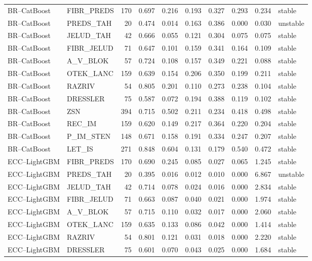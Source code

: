 \begin{longtable}{llrrrrrrrl}
BR--CatBoost & FIBR\_PREDS & 170 & 0.697 & 0.216 & 0.193 & 0.327 & 0.293 & 0.234 & stable \\
BR--CatBoost & PREDS\_TAH & 20 & 0.474 & 0.014 & 0.163 & 0.386 & 0.000 & 0.030 & unstable \\
BR--CatBoost & JELUD\_TAH & 42 & 0.666 & 0.055 & 0.121 & 0.304 & 0.075 & 0.075 & stable \\
BR--CatBoost & FIBR\_JELUD & 71 & 0.647 & 0.101 & 0.159 & 0.341 & 0.164 & 0.109 & stable \\
BR--CatBoost & A\_V\_BLOK & 57 & 0.724 & 0.108 & 0.157 & 0.349 & 0.221 & 0.088 & stable \\
BR--CatBoost & OTEK\_LANC & 159 & 0.639 & 0.154 & 0.206 & 0.350 & 0.199 & 0.211 & stable \\
BR--CatBoost & RAZRIV & 54 & 0.805 & 0.201 & 0.110 & 0.273 & 0.238 & 0.104 & stable \\
BR--CatBoost & DRESSLER & 75 & 0.587 & 0.072 & 0.194 & 0.388 & 0.119 & 0.102 & stable \\
BR--CatBoost & ZSN & 394 & 0.715 & 0.502 & 0.211 & 0.234 & 0.418 & 0.498 & stable \\
BR--CatBoost & REC\_IM & 159 & 0.620 & 0.149 & 0.217 & 0.364 & 0.220 & 0.204 & stable \\
BR--CatBoost & P\_IM\_STEN & 148 & 0.671 & 0.158 & 0.191 & 0.334 & 0.247 & 0.207 & stable \\
BR--CatBoost & LET\_IS & 271 & 0.848 & 0.604 & 0.131 & 0.179 & 0.540 & 0.472 & stable \\
ECC--LightGBM & FIBR\_PREDS & 170 & 0.690 & 0.245 & 0.085 & 0.027 & 0.065 & 1.245 & stable \\
ECC--LightGBM & PREDS\_TAH & 20 & 0.395 & 0.016 & 0.012 & 0.010 & 0.000 & 6.867 & unstable \\
ECC--LightGBM & JELUD\_TAH & 42 & 0.714 & 0.078 & 0.024 & 0.016 & 0.000 & 2.834 & stable \\
ECC--LightGBM & FIBR\_JELUD & 71 & 0.663 & 0.087 & 0.040 & 0.021 & 0.000 & 1.974 & stable \\
ECC--LightGBM & A\_V\_BLOK & 57 & 0.715 & 0.110 & 0.032 & 0.017 & 0.000 & 2.060 & stable \\
ECC--LightGBM & OTEK\_LANC & 159 & 0.635 & 0.133 & 0.086 & 0.042 & 0.000 & 1.414 & stable \\
ECC--LightGBM & RAZRIV & 54 & 0.801 & 0.121 & 0.031 & 0.018 & 0.000 & 2.220 & stable \\
ECC--LightGBM & DRESSLER & 75 & 0.601 & 0.070 & 0.043 & 0.025 & 0.000 & 1.684 & stable \\

\end{longtable}
